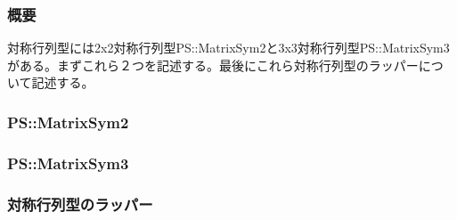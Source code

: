 \subsubsection{概要}

対称行列型には2x2対称行列型PS::MatrixSym2と3x3対称行列型PS::MatrixSym3
がある。まずこれら２つを記述する。最後にこれら対称行列型のラッパーにつ
いて記述する。

\subsubsection{PS::MatrixSym2}



\subsubsection{PS::MatrixSym3}



\subsubsection{対称行列型のラッパー}



